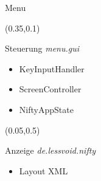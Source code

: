 \documentclass[10pt]{beamer}
\begin{document}
\begin{frame}[fragile]{Menu}
    \setlength{\TPHorizModule}{\textwidth}
    \setlength{\TPVertModule}{\textwidth}
   
    \begin{textblock}{0.5}(0.35,0.1)
            \begin{block}{Steuerung}
                \textit{menu.gui}
                \begin{itemize}
                    \item KeyInputHandler
                    \item ScreenController
                    \item NiftyAppState
                \end{itemize}
            \end{block}
    \end{textblock}

    \begin{textblock}{0.5}(0.05,0.5)
        \begin{block}{Anzeige}
            \textit{de.lessvoid.nifty}
            \begin{itemize}
                \item Layout XML
            \end{itemize}
        \end{block}
    \end{textblock}

\end{frame}
\end{document}
